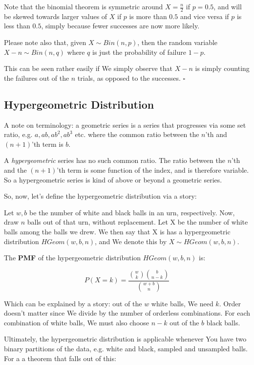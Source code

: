 \documentclass{article}
\newcommand{\qed}{\hfill$\square$}
\begin{document}
		Note that the binomial theorem is symmetric around $X=\frac{n}{2}$ if $p=0.5$, and will be skewed towards larger values of $X$ if $p$ is more than $0.5$ and vice versa if $p$ is less than $0.5$, simply because fewer successes are now more likely.
		
		Please note also that, given $X \sim Bin(n, p)$, then the random variable $X-n \sim Bin(n, q)$ where $q$ is just the probability of failure $1-p$.
		
		This can be seen rather easily if We simply observe that $X-n$ is simply counting the failures out of the $n$ trials, as opposed to the successes. \qed
		
	\subsection{Hypergeometric Distribution}
	
		A note on terminology: a geometric series is a series that progresses via some set ratio, e.g. $a, ab, ab^2, ab^3$ etc. where the common ratio between the $n$'th and $(n+1)$'th term is $b$.
		
		A \textit{hypergeometric} series has no such common ratio. The ratio between the $n$'th and the $(n+1)$'th term is some function of the index, and is therefore variable. So a hypergeometric series is kind of above or beyond a geometric series. 
		
		So, now, let's define the hypergeometric distribution via a story:
		
		Let $w, b$ be the number of white and black balls in an urn, respectively. Now, draw $n$ balls out of that urn, without replacement. Let X be the number of white balls among the balls we drew. We then say that X is has a hypergeometric distribution $HGeom(w, b, n)$, and We denote this by $X\sim HGeom(w, b, n)$.
		
		The \textbf{PMF} of the hypergeometric distribution $HGeom(w, b, n)$ is:
		
		$$P(X = k) = \frac{{w \choose k}{b \choose n-k}}{{w+b \choose n}}$$
		
		Which can be explained by a story: out of the $w$ white balls, We need $k$. Order doesn't matter since We divide by the number of orderless combinations. For each combination of white balls, We must also choose $n-k$ out of the $b$ black balls.
		
		Ultimately, the hypergeometric distribution is applicable whenever You have two binary partitions of the data, e.g. white and black, sampled and unsampled balls. For a a theorem that falls out of this:
		
\end{document}
